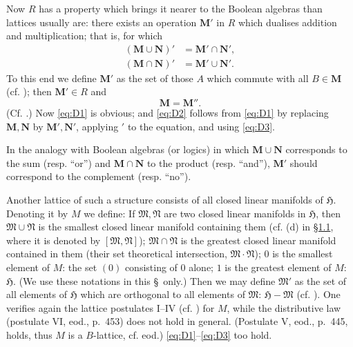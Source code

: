 \documentclass[12pt,b5paper,twoside]{article}
\newcommand{\Hspace}{\mathfrak H}
\newcommand{\M}{\mathbf M}
\newcommand{\N}{\mathbf N}
\newcommand{\secref}[1]{\hyperref[sec:#1]{\S#1}}
\begin{document}
Now $R$ has a property which brings it nearer to the Boolean algebras than
lattices usually are: there exists an operation $\M'$ in $R$ which dualises
addition and multiplication; that is, for which
\begin{align}
 (\M\cup\N)'&=\M'\cap\N', \tag{$D_1$}\label{eq:D1}\\
 (\M\cap\N)'&=\M'\cup\N'. \tag{$D_2$}\label{eq:D2}
\end{align}
To this end we define $\M'$ as the set of those $A$ which commute with all
$B\in\M$ (cf. \cite[p.~374]{ref18}); then $\M'\in R$ and
\begin{equation*}
 \M=\M''. \tag{$D_3$}\label{eq:D3}
\end{equation*}
(Cf. \cite[p.~397]{ref18}.) Now \eqref{eq:D1} is obvious; and
\eqref{eq:D2} follows from \eqref{eq:D1} by replacing $\M,\N$ by
$\M',\N'$, applying $'$ to the equation, and using \eqref{eq:D3}.

In the analogy with Boolean algebras (or logics) in which $\M\cup\N$
corresponds to the sum (resp. ``or'') and $\M\cap\N$ to the product (resp.
``and''), $\M'$ should correspond to the complement (resp. ``no'').

Another lattice of such a structure consists of all closed linear manifolds of
$\Hspace$. Denoting it by $M$ we define: If $\mathfrak M,\mathfrak N$ are two
closed linear manifolds in $\Hspace$, then $\mathfrak M\cup\mathfrak N$ is the
smallest closed linear manifold containing them (cf. (d) in \secref{1.1}, where
it is denoted by $[\mathfrak M,\mathfrak N]$); $\mathfrak M\cap\mathfrak N$
is the greatest closed linear manifold contained in them (their set theoretical
intersection, $\mathfrak M\cdot\mathfrak N$); $0$ is the smallest element of
$M$: the set $(0)$ consisting of $0$ alone; $1$ is the greatest element of $M$:
$\Hspace$. (We use these notations in this \hyperref[intro:2]{\S}\ only.)
Then we may define
$\mathfrak M'$ as the set of all elements of $\Hspace$ which are orthogonal to
all elements of $\mathfrak M$: $\Hspace-\mathfrak M$
(cf. \cite[p.~74]{ref16}). One verifies again the lattice postulates I--IV
(cf. \cite[p.~422]{ref1}) for $M$, while the distributive law (postulate VI,
eod., p.~453) does not hold in general. (Postulate V, eod., p.~445, holds,
thus $M$ is a $B$-lattice, cf. eod.) \eqref{eq:D1}--\eqref{eq:D3} too hold.
\end{document}
